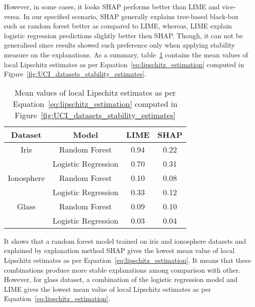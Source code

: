 \documentclass[english]{tktltiki2}
\theoremstyle{definition}
\theoremstyle{remark}
\begin{document}
However, in some cases, it looks SHAP performs better than LIME and vice-versa. In our specified scenario, SHAP generally explains tree-based black-box such as random forest better as compared to LIME, whereas, LIME explain logistic regression predictions slightly better then SHAP. Though, it can not be generalised since results showed such preference only when applying stability measure on the explanations. As a summary, table~\ref{table:lipschitz_estimation_aggregated_datasets_UCI} contains the mean values of local Lipschitz estimates as per Equation~\eqref{eq:lipschitz_estimation} computed in Figure~\ref{fig:UCI_datasets_stability_estimates}.

\begin{table}[H]
	\caption{Mean values of local Lipschitz estimates as per Equation~\eqref{eq:lipschitz_estimation} computed in Figure~\ref{fig:UCI_datasets_stability_estimates}}
	\label{table:lipschitz_estimation_aggregated_datasets_UCI}
	\begin{center}
		\begin{tabular}{|c|c|c|c|}
			\hline
			\textbf{Dataset} & \textbf{Model} & \textbf{LIME} & \textbf{SHAP} \\ \hline
			
			Iris & Random Forest & 0.94 & 0.22  \\ \hline
			& Logistic Regression & 0.70 & 0.31 \\ \hline
			
			Ionosphere & Random Forest & 0.10 & 0.08 \\ \hline
			& Logistic Regression & 0.33 & 0.12 \\ \hline
			
			Glass & Random Forest & 0.09 & 0.10 \\ \hline
			& Logistic Regression & 0.03 & 0.04 \\ \hline
			
		\end{tabular}
	\end{center}
\end{table}

It shows that a random forest model trained on iris and ionosphere datasets and explained by explanation method SHAP gives the lowest mean value of local Lipschitz estimates as per Equation~\eqref{eq:lipschitz_estimation}. It means that these combinations produce more stable explanations among comparison with other. However, for glass dataset, a combination of the logistic regression model and LIME gives the lowest mean value of local Lipschitz estimates as per Equation~\eqref{eq:lipschitz_estimation}.
\end{document}

